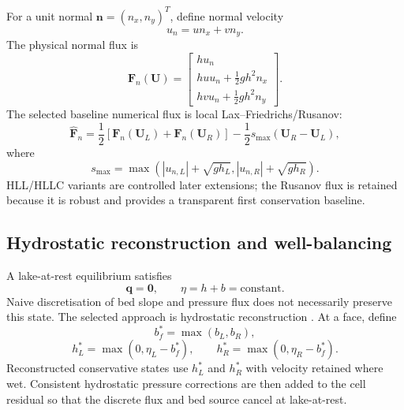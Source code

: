 \documentclass[11pt,a4paper]{article}
\newcommand{\vect}[1]{\bm{#1}}
\begin{document}
For a unit normal $\vect n=(n_x,n_y)^T$, define normal velocity
\begin{equation}
  u_n=u n_x+v n_y.
\end{equation}
The physical normal flux is
\begin{equation}
  \vect F_n(\vect U)=
  \begin{bmatrix}
  h u_n\\
  h u u_n+\frac{1}{2}gh^2n_x\\
  h v u_n+\frac{1}{2}gh^2n_y
  \end{bmatrix}.
\end{equation}
The selected baseline numerical flux is local Lax--Friedrichs/Rusanov:
\begin{equation}
  \widehat{\vect F}_{n}
  =\frac{1}{2}\left[\vect F_n(\vect U_L)+\vect F_n(\vect U_R)\right]
  -\frac{1}{2}s_{\max}(\vect U_R-\vect U_L),
  \label{eq:rusanov}
\end{equation}
where
\begin{equation}
  s_{\max}=\max\left(
  |u_{n,L}|+\sqrt{gh_L},
  |u_{n,R}|+\sqrt{gh_R}
  \right).
\end{equation}
HLL/HLLC variants are controlled later extensions; the Rusanov flux is retained because it is robust and provides a transparent first conservation baseline.

\subsection{Hydrostatic reconstruction and well-balancing}

A lake-at-rest equilibrium satisfies
\begin{equation}
  \vect q=\vect 0,
  \qquad \eta=h+b=\text{constant}.
\end{equation}
Naive discretisation of bed slope and pressure flux does not necessarily preserve this state. The selected approach is hydrostatic reconstruction \cite{audusse2004}. At a face, define
\begin{equation}
  b_f^*=\max(b_L,b_R),
\end{equation}
\begin{equation}
  h_L^*=\max(0,\eta_L-b_f^*),
  \qquad
  h_R^*=\max(0,\eta_R-b_f^*).
\end{equation}
Reconstructed conservative states use $h_L^*$ and $h_R^*$ with velocity retained where wet. Consistent hydrostatic pressure corrections are then added to the cell residual so that the discrete flux and bed source cancel at lake-at-rest.
\end{document}
